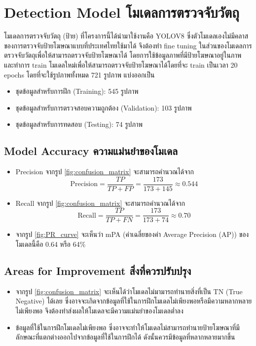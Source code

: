 \clearpage

\section{\ifenglish Detection Model \else โมเดลการตรวจจับวัตถุ \fi}
\ifenglish \else
โมเดลการตรวจจับวัตถุ (ป้าย) ที่โครงการนี้ได้นำมาใช้งานคือ YOLOV8 ซึ่งตัวโมเดลเองไม่มีคลาสของการตรวจจับป้ายโฆษณาแบบที่ประเทศไทยใช้มาได้ จึงต้องทำ fine tuning ในส่วนของโมเดลการตรวจจับวัตถุเพื่อให้สามารถตรวจจับป้ายโฆษณาได้ โดยการใช้ข้อมูลภาพที่มีป้ายโฆษณาอยู่ในภาพ และทำการ train โมเดลใหม่เพื่อให้สามารถตรวจจับป้ายโฆษณาได้โดยที่จะ train เป็นเวลา 20 epochs โดยที่จะใช้รูปภาพทั้งหมด 721 รูปภาพ แบ่งออกเป็น
\begin{itemize}
    \item ชุดข้อมูลสำหรับการฝึก (Training): 545 รูปภาพ
    \item ชุดข้อมูลสำหรับการตรวจสอบความถูกต้อง (Validation): 103 รูปภาพ
    \item ชุดข้อมูลสำหรับการทดสอบ (Testing): 74 รูปภาพ
\end{itemize}
\fi

\subsection{\ifenglish Model Accuracy \else ความแม่นยำของโมเดล \fi}
\ifenglish \else
\begin{itemize}
    \item Precision จากรูป \ref{fig:confusion_matrix} จะสามารถคำนวณได้จาก \\
        \[
            \text{Precision} = \frac{TP}{TP + FP} = \frac{173}{173 + 145} \approx 0.544
        \]
    \item Recall จากรูป \ref{fig:confusion_matrix} จะสามารถคำนวณได้จาก \\
        \[
            \text{Recall} = \frac{TP}{TP + FN} = \frac{173}{173 + 74} \approx 0.70
        \]
    \item จากรูป \ref{fig:PR_curve} จะเห็นว่า mPA (ค่าเฉลี่ยของค่า Average Precision (AP)) ของโมเดลนี้คือ 0.64 หรือ 64\%
\end{itemize}
\fi

\subsection{\ifenglish Areas for Improvement \else สิ่งที่ควรปรับปรุง \fi}
\begin{itemize}
    \item จากรูป \ref{fig:confusion_matrix} จะเห็นได้ว่าโมเดลไม่มามารถทำนายสิ่งที่เป็น TN (True Negative) ได้เลย ซึ่งอาจจะเกิดจากข้อมูลที่ใช้ในการฝึกโมเดลไม่เพียงพอหรือมีความหลากหลายไม่เพียงพอ จึงต้องทำส่งผลให้โมเดลจะมีความแม่นยำของโมเดลต่ำลง
    \item ข้อมูลที่ใช้ในการฝึกโมเดลไม่เพียงพอ ซึ่งอาจจะทำให้โมเดลไม่สามารถทำนายป้ายโฆษณาที่มีลักษณะที่แตกต่างออกไปจากข้อมูลที่ใช้ในการฝึกได้ ดังนั้นควรมีข้อมูลที่หลากหลายมากขึ้น
\end{itemize}


